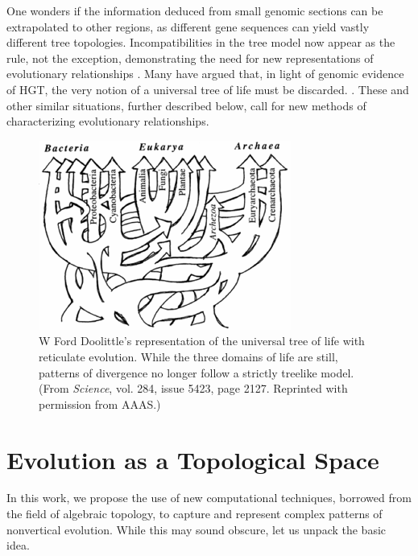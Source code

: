 One wonders if the information deduced from small genomic sections can be extrapolated to other regions, as different gene sequences can yield vastly different tree topologies.
Incompatibilities in the tree model now appear as the rule, not the exception, demonstrating the need for new representations of evolutionary relationships \autocite{Doolittle:1999,Doolittle:2006}.
Many have argued that, in light of genomic evidence of HGT, the very notion of a universal tree of life must be discarded. .
These and other similar situations, further described below, call for new methods of characterizing evolutionary relationships.

\begin{figure}
\centering
\includegraphics[width=.8\columnwidth]{./fig/introduction/doolittle_tree.png}
\caption[Ford Doolittle's Reticulate Tree of Life]{W Ford Doolittle's representation of the universal tree of life with reticulate evolution. While the three domains of life are still, patterns of divergence no longer follow a strictly treelike model. (From \emph{Science}, vol. 284, issue 5423, page 2127. Reprinted with permission from AAAS.)}
\label{fig:doolittle_tree}
\end{figure}

\section{Evolution as a Topological Space}

In this work, we propose the use of new computational techniques, borrowed from the field of algebraic topology, to capture and represent complex patterns of nonvertical evolution.
While this may sound obscure, let us unpack the basic idea.

